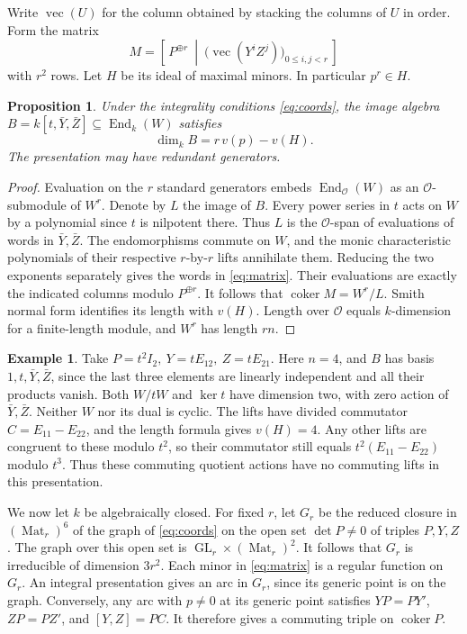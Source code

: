\documentclass[11pt,reqno]{amsart}
\newtheorem{proposition}[theorem]{Proposition}
\theoremstyle{definition}
\newtheorem{example}[theorem]{Example}
\newcommand{\Mat}{\operatorname{Mat}}
\newcommand{\End}{\operatorname{End}}
\newcommand{\coker}{\operatorname{coker}}
\newcommand{\GL}{\operatorname{GL}}
\newcommand{\OO}{\mathcal O}
\begin{document}
Write \(\operatorname{vec}(U)\) for the column obtained by stacking the
columns of \(U\) in order. Form the matrix
\begin{equation}\label{eq:matrix}
  M=\left[\,P^{\oplus r}\ \middle|\
       \big(\operatorname{vec}(Y^iZ^j)\big)_{0\leq i,j<r}\,\right]
\end{equation}
with \(r^2\) rows. Let \(H\) be its ideal of maximal minors. In particular
\(p^r\in H\).
\begin{proposition}\label{prop:length}
Under the integrality conditions \eqref{eq:coords}, the image algebra
\(B=k[t,\bar Y,\bar Z]\subseteq\End_k(W)\) satisfies
\[
                      \dim_k B=r\,v(p)-v(H).
\]
The presentation may have redundant generators.
\end{proposition}
\begin{proof}
Evaluation on the \(r\) standard generators embeds \(\End_{\OO}(W)\)
as an \(\OO\)-submodule of \(W^r\). Denote by \(L\) the image of \(B\).
Every power series in \(t\) acts on \(W\) by a polynomial since \(t\)
is nilpotent there. Thus \(L\) is the \(\OO\)-span of evaluations of
words in \(\bar Y,\bar Z\). The endomorphisms commute on \(W\), and the
monic characteristic polynomials of their respective \(r\)-by-\(r\)
lifts annihilate them. Reducing the two exponents separately gives the
words in \eqref{eq:matrix}. Their evaluations are exactly the indicated
columns modulo \(P^{\oplus r}\). It follows that \(\coker M=W^r/L\).
Smith normal form identifies its length with \(v(H)\). Length over
\(\OO\) equals \(k\)-dimension for a finite-length module, and \(W^r\)
has length \(rn\).
\end{proof}

\begin{example}\label{ex:equal}
Take \(P=t^2I_2,\ Y=tE_{12},\ Z=tE_{21}\). Here \(n=4\), and \(B\)
has basis \(1,t,\bar Y,\bar Z\), since the last three elements are linearly
independent and all their products vanish. Both \(W/tW\) and \(\ker t\)
have dimension two, with zero action of \(\bar Y,\bar Z\). Neither \(W\)
nor its dual is cyclic. The lifts have divided commutator
\(C=E_{11}-E_{22}\), and the length formula gives \(v(H)=4\).
Any other lifts are congruent to these modulo \(t^2\), so their
commutator still equals \(t^2(E_{11}-E_{22})\) modulo \(t^3\).
Thus these commuting quotient actions have no commuting lifts in this
presentation.
\end{example}

We now let \(k\) be algebraically closed. For fixed \(r\), let \(G_r\)
be the reduced closure in \((\Mat_r)^6\) of the graph of
\eqref{eq:coords} on the open set \(\det P\ne0\) of triples \(P,Y,Z\).
The graph over this open set is \(\GL_r\times(\Mat_r)^2\). It follows
that \(G_r\) is irreducible of dimension \(3r^2\). Each minor in
\eqref{eq:matrix} is a regular function on \(G_r\). An integral
presentation gives an arc in \(G_r\), since its generic point is on the
graph. Conversely, any arc with \(p\ne0\) at its generic point satisfies
\(YP=PY'\), \(ZP=PZ'\), and \([Y,Z]=PC\). It therefore gives a commuting
triple on \(\coker P\).
\end{document}
